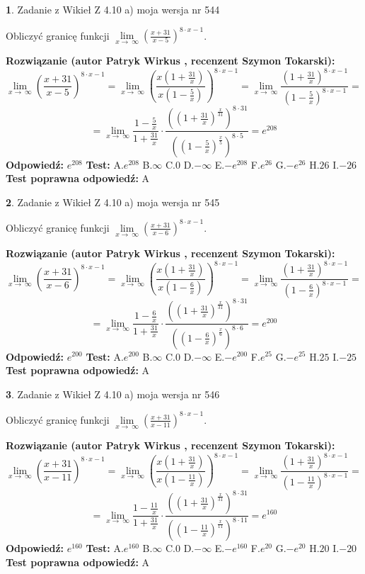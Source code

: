 \documentclass[12pt, a4paper]{article}
\theoremstyle{definition} %
\newtheorem{zad}{}
\newcommand{\zadStart}[1]{\begin{zad}#1\newline}
\newcommand{\zadStop}{\end{zad}}
\newcommand{\rozwStart}[2]{\noindent \textbf{Rozwiązanie (autor #1 , recenzent #2): }\newline}
\newcommand{\rozwStop}{\newline}
\newcommand{\odpStart}{\noindent \textbf{Odpowiedź:}\newline}
\newcommand{\odpStop}{\newline}
\newcommand{\testStart}{\noindent \textbf{Test:}\newline}
\newcommand{\testStop}{\newline}
\newcommand{\kluczStart}{\noindent \textbf{Test poprawna odpowiedź:}\newline}
\newcommand{\kluczStop}{\newline}
\begin{document}
\zadStart{Zadanie z Wikieł Z 4.10 a) moja wersja nr 544}

Obliczyć granicę funkcji  $\lim\limits_{x\to\ \infty}(\frac{x+31}{x-5})^{8\cdot x-1}$.
\zadStop
\rozwStart{Patryk Wirkus}{Szymon Tokarski}
$$\lim\limits_{x\to\ \infty}(\frac{x+31}{x-5})^{8\cdot x-1} = \lim\limits_{x\to\ \infty}(\frac{x(1+\frac{31}{x})}{x(1-\frac{5}{x})})^{8\cdot x-1}=\lim\limits_{x\to\ \infty}\frac{(1+\frac{31}{x})^{8\cdot x-1}}{(1-\frac{5}{x})^{8\cdot x-1}}=$$
$$=\lim\limits_{x\to\ \infty}\frac{1-\frac{5}{x}}{1+\frac{31}{x}}\cdot\frac{((1+\frac{31}{x})^{\frac{x}{31}})^{8\cdot31}}{((1-\frac{5}{x})^{\frac{x}{5}})^{8\cdot5}}=e^{208}$$
\rozwStop
\odpStart
$e^{208}$
\odpStop
\testStart
A.$e^{208}$ B.$\infty$ C.$0$ D.$-\infty$ E.$-e^{208}$
F.$e^{26}$ G.$-e^{26}$
H.$26$
I.$-26$
\testStop
\kluczStart
A
\kluczStop



\zadStart{Zadanie z Wikieł Z 4.10 a) moja wersja nr 545}

Obliczyć granicę funkcji  $\lim\limits_{x\to\ \infty}(\frac{x+31}{x-6})^{8\cdot x-1}$.
\zadStop
\rozwStart{Patryk Wirkus}{Szymon Tokarski}
$$\lim\limits_{x\to\ \infty}(\frac{x+31}{x-6})^{8\cdot x-1} = \lim\limits_{x\to\ \infty}(\frac{x(1+\frac{31}{x})}{x(1-\frac{6}{x})})^{8\cdot x-1}=\lim\limits_{x\to\ \infty}\frac{(1+\frac{31}{x})^{8\cdot x-1}}{(1-\frac{6}{x})^{8\cdot x-1}}=$$
$$=\lim\limits_{x\to\ \infty}\frac{1-\frac{6}{x}}{1+\frac{31}{x}}\cdot\frac{((1+\frac{31}{x})^{\frac{x}{31}})^{8\cdot31}}{((1-\frac{6}{x})^{\frac{x}{6}})^{8\cdot6}}=e^{200}$$
\rozwStop
\odpStart
$e^{200}$
\odpStop
\testStart
A.$e^{200}$ B.$\infty$ C.$0$ D.$-\infty$ E.$-e^{200}$
F.$e^{25}$ G.$-e^{25}$
H.$25$
I.$-25$
\testStop
\kluczStart
A
\kluczStop



\zadStart{Zadanie z Wikieł Z 4.10 a) moja wersja nr 546}

Obliczyć granicę funkcji  $\lim\limits_{x\to\ \infty}(\frac{x+31}{x-11})^{8\cdot x-1}$.
\zadStop
\rozwStart{Patryk Wirkus}{Szymon Tokarski}
$$\lim\limits_{x\to\ \infty}(\frac{x+31}{x-11})^{8\cdot x-1} = \lim\limits_{x\to\ \infty}(\frac{x(1+\frac{31}{x})}{x(1-\frac{11}{x})})^{8\cdot x-1}=\lim\limits_{x\to\ \infty}\frac{(1+\frac{31}{x})^{8\cdot x-1}}{(1-\frac{11}{x})^{8\cdot x-1}}=$$
$$=\lim\limits_{x\to\ \infty}\frac{1-\frac{11}{x}}{1+\frac{31}{x}}\cdot\frac{((1+\frac{31}{x})^{\frac{x}{31}})^{8\cdot31}}{((1-\frac{11}{x})^{\frac{x}{11}})^{8\cdot11}}=e^{160}$$
\rozwStop
\odpStart
$e^{160}$
\odpStop
\testStart
A.$e^{160}$ B.$\infty$ C.$0$ D.$-\infty$ E.$-e^{160}$
F.$e^{20}$ G.$-e^{20}$
H.$20$
I.$-20$
\testStop
\kluczStart
A
\kluczStop
\end{document}
